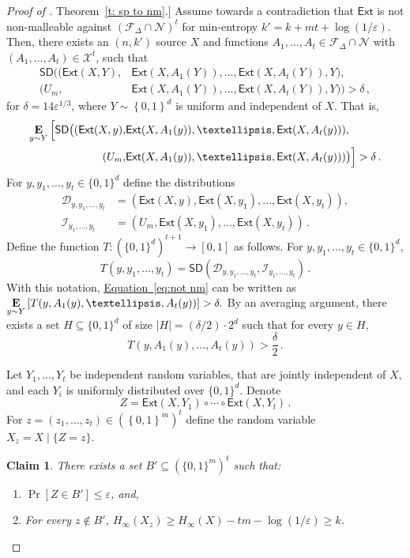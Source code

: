 \documentclass[11pt]{article}
\numberwithin{equation}{section}
\newtheorem{claim}[theorem]{Claim}
\theoremstyle{definition}
\theoremstyle{plain}
\newcommand{\expref}[2]{\hyperref[#2]{#1~\ref{#2}}}
\newcommand{\expeqref}[2]{\hyperref[#2]{#1~\eqref{#2}}}
\newcommand{\ext}{\mathsf{Ext}}
\newcommand{\adv}{A}
\newcommand{\eps}{\varepsilon}
\newcommand{\nc}{\mathcal{X}}
\newcommand{\set}[1]{\left\{{#1}\right\}}
\newcommand{\B}{\set{0,1}}
\newcommand{\E}{\mathop{\bf E\/}}
\newcommand{\advfampart}{\mathcal{F}}
\newcommand{\nofp}{\mathcal{N}}
\newcommand{\minent}[1]{H_{\infty}(#1)}
\def\SD{\ensuremath{\mathsf{SD}}}
\begin{document}
\begin{proof}[Proof of \expref{Theorem}{t: sp to nm}.]
Assume towards a contradiction that $\ext$ is not non-malleable against $\left(\advfampart_{\Delta} \cap \nofp\right)^t$ for min-entropy $k' = k + mt + \log(1/\eps)$. Then, there exists an $(n,k')$ source $X$ and functions $\adv_1,\ldots,\adv_t \in \advfampart_{\Delta} \cap \nofp$ with $(\adv_1,\ldots,\adv_t) \in \nc^t$, such that
\begin{align*}
\SD \Big( \big( \ext(X,Y), &\ext(X,\adv_1(Y)),\ldots, \ext(X,\adv_t(Y)), Y \big), \\
           \big( U_m, &\ext(X,\adv_1(Y)),\ldots, \ext(X,\adv_t(Y)),  Y \big)
    \Big) > \delta\,,
\end{align*}
for $\delta = 14 \eps^{1/3}$, where $Y \sim \B^d$ is uniform and independent of $X$.
That is,
\begin{align}\label{eq:not nm}
\E_{y \sim Y}\Big[ \SD\big( ( \ext(X,y), &\ext(X,\adv_1(y)), \ldots, \ext(X,\adv_t(y)) ), \notag \\
           ( U_m, &\ext(X,\adv_1(y)), \ldots, \ext(X,\adv_t(y)) )\big) \Big] > \delta\,.
\end{align}
For $y,y_1,\ldots,y_t \in \{0,1\}^d$ define the distributions 
\begin{align*}
\mathcal{D}_{y,y_1,\ldots,y_t} &= \left( \ext(X,y), \ext(X,y_1),\ldots,\ext(X,y_t)  \right), \\
\mathcal{I}_{y_1,\ldots,y_t}   &= \left(U_m, \ext(X,y_1),\ldots,\ext(X,y_t) \right)\,.
\end{align*}
Define the function $T \colon \left(\{0,1\}^d\right)^{t+1} \to [0,1]$ as follows. For $y,y_1,\ldots,y_t \in \{0,1\}^d$,
\[
T(y,y_1,\ldots,y_t) = \SD\left( \mathcal{D}_{y,y_1,\ldots,y_t}, \mathcal{I}_{y_1,\ldots,y_t} \right)\,.
\]
With this notation, \expeqref{Equation}{eq:not nm} can be written as
$
\E\limits_{y \sim Y}{\left[T(y,\adv_1(y), \ldots, \adv_t(y))\right]} > \delta.
$
By an averaging argument, there exists a set $H \subseteq \{0,1\}^d$ of size $|H| = (\delta/2) \cdot 2^d$ such that for every $y \in H$,
\[
T(y,\adv_1(y), \ldots, \adv_t(y)) > \frac{\delta}{2}\,.
\]

 
Let $Y_1,\ldots, Y_t$ be independent random variables, that are jointly 
independent of $X$, and each $Y_i$ is uniformly distributed over 
$\{0,1\}^d$. Denote 
\[
Z = \ext(X,Y_1)\circ\cdots\circ\ext(X,Y_t)\,.
\] For 
$z = (z_1,\ldots , z_t)  \in (\B^m)^t$ define the random variable $X_{z} = X \mid \{Z=z\}.$
\begin{claim}\label{lem: cond entropy most cases}
There exists a set $B' \subseteq (\{0,1\}^m)^t$ such that: 
\begin{enumerate}
	\item\label{it1} $\Pr[Z \in B'] \le \eps$, and,
	\item\label{it2} For every $z \notin B'$, $\minent{X_{z}}  \ge \minent{X} - tm - \log(1/\eps) \ge k$.
\end{enumerate}
\end{claim}


\end{proof}
\end{document}
